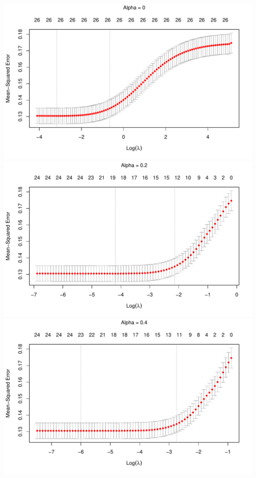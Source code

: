 \documentclass[
]{article}
\begin{document}
\includegraphics{A2_files/figure-latex/unnamed-chunk-8-1.pdf}
\includegraphics{A2_files/figure-latex/unnamed-chunk-8-2.pdf}
\includegraphics{A2_files/figure-latex/unnamed-chunk-8-3.pdf}
\end{document}
